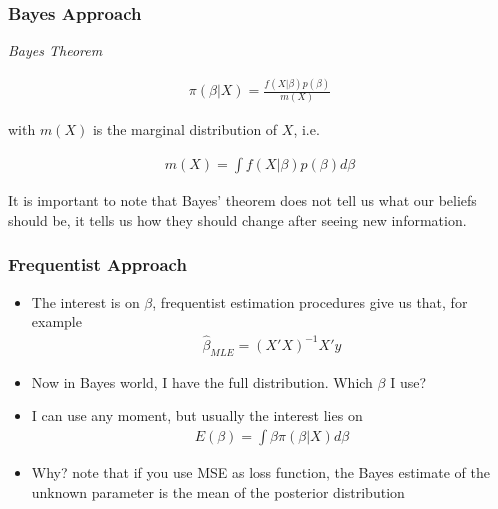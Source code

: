 \documentclass[
  shownotes,
  xcolor={svgnames},
  hyperref={colorlinks,citecolor=DarkBlue,linkcolor=DarkRed,urlcolor=DarkBlue}
  , aspectratio=169]{beamer}
\begin{document}
\begin{frame}[fragile]
\frametitle{Bayes Approach}
{\it Bayes Theorem}

\bigskip
\begin{align}
\pi (\beta|X)=\frac{f(X|\beta)p(\beta)}{m(X)}
\end{align}

\bigskip
with $m(X)$ is the marginal distribution of $X$, i.e.

\begin{align}
m(X)=\int f(X|\beta)p(\beta)d\beta
\end{align}

It is important to note that Bayes' theorem  does not tell us what our beliefs should be, it tells us how they should change after seeing new information.
\end{frame}


\begin{frame}[fragile]
\frametitle{Frequentist Approach}

\begin{itemize}
\item The interest is on $\beta$, frequentist estimation procedures give us that, for example
\medskip
\begin{align}
\hat{\beta}_{MLE}=(X'X)^{-1}X'y
\end{align}
\medskip

\item Now in Bayes world, I have the full distribution. Which $\beta$ I use?
\medskip
\item I can use any moment, but usually the interest lies on 
\begin{align}
E(\beta)=\int \beta \pi(\beta|X) d\beta
\end{align}

\item Why? note that if you use MSE as loss function, the Bayes estimate of the unknown parameter is  the mean of the posterior distribution
\end{itemize}




\end{frame}

\end{document}
